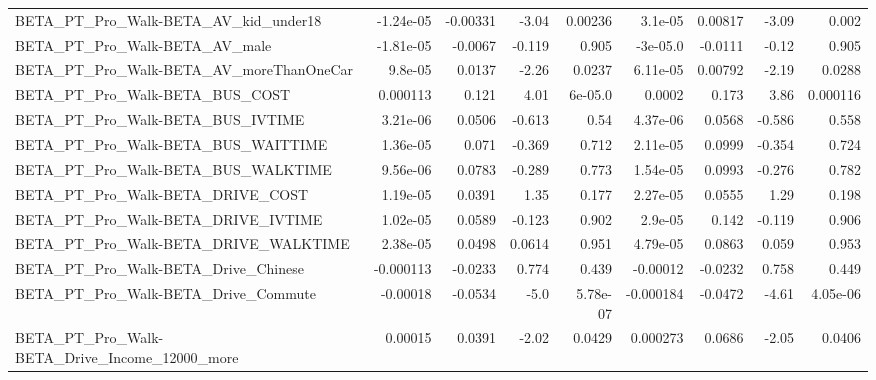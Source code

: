 \begin{tabular}{lrrrrrrrr}
BETA\_PT\_Pro\_Walk-BETA\_AV\_kid\_under18               &   -1.24e-05 &     -0.00331 &     -3.04 &  0.00236 &    3.1e-05 &     0.00817 &        -3.09 &         0.002 \\
BETA\_PT\_Pro\_Walk-BETA\_AV\_male                      &   -1.81e-05 &      -0.0067 &    -0.119 &    0.905 &   -3e-05.0 &     -0.0111 &        -0.12 &         0.905 \\
BETA\_PT\_Pro\_Walk-BETA\_AV\_moreThanOneCar            &     9.8e-05 &       0.0137 &     -2.26 &   0.0237 &   6.11e-05 &     0.00792 &        -2.19 &        0.0288 \\
BETA\_PT\_Pro\_Walk-BETA\_BUS\_COST                     &    0.000113 &        0.121 &      4.01 &  6e-05.0 &     0.0002 &       0.173 &         3.86 &      0.000116 \\
BETA\_PT\_Pro\_Walk-BETA\_BUS\_IVTIME                   &    3.21e-06 &       0.0506 &    -0.613 &     0.54 &   4.37e-06 &      0.0568 &       -0.586 &         0.558 \\
BETA\_PT\_Pro\_Walk-BETA\_BUS\_WAITTIME                 &    1.36e-05 &        0.071 &    -0.369 &    0.712 &   2.11e-05 &      0.0999 &       -0.354 &         0.724 \\
BETA\_PT\_Pro\_Walk-BETA\_BUS\_WALKTIME                 &    9.56e-06 &       0.0783 &    -0.289 &    0.773 &   1.54e-05 &      0.0993 &       -0.276 &         0.782 \\
BETA\_PT\_Pro\_Walk-BETA\_DRIVE\_COST                   &    1.19e-05 &       0.0391 &      1.35 &    0.177 &   2.27e-05 &      0.0555 &         1.29 &         0.198 \\
BETA\_PT\_Pro\_Walk-BETA\_DRIVE\_IVTIME                 &    1.02e-05 &       0.0589 &    -0.123 &    0.902 &    2.9e-05 &       0.142 &       -0.119 &         0.906 \\
BETA\_PT\_Pro\_Walk-BETA\_DRIVE\_WALKTIME               &    2.38e-05 &       0.0498 &    0.0614 &    0.951 &   4.79e-05 &      0.0863 &        0.059 &         0.953 \\
BETA\_PT\_Pro\_Walk-BETA\_Drive\_Chinese                &   -0.000113 &      -0.0233 &     0.774 &    0.439 &   -0.00012 &     -0.0232 &        0.758 &         0.449 \\
BETA\_PT\_Pro\_Walk-BETA\_Drive\_Commute                &    -0.00018 &      -0.0534 &      -5.0 & 5.78e-07 &  -0.000184 &     -0.0472 &        -4.61 &      4.05e-06 \\
BETA\_PT\_Pro\_Walk-BETA\_Drive\_Income\_12000\_more      &     0.00015 &       0.0391 &     -2.02 &   0.0429 &   0.000273 &      0.0686 &        -2.05 &        0.0406 \\

\end{tabular}
